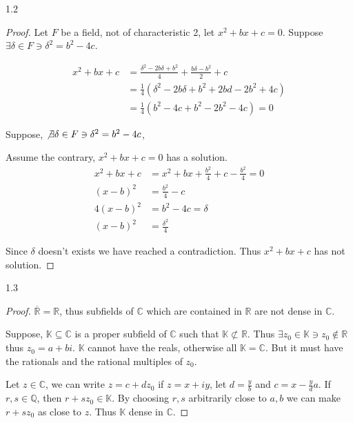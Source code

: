 \documentclass{article}
\newcommand{\C}{\mathbb{C}}
\newcommand{\R}{\mathbb{R}}
\newcommand{\Q}{\mathbb{Q}}
\begin{document}
\begin{PROB}{1.2}\label{Problem 1.2.}
\end{PROB}
\begin{proof}
    Let $F$ be a field, not of characteristic 2, let $x^2 + bx + c = 0$. Suppose $\exists \delta \in F \ni \delta^2 = b^2 - 4c$. 
    
    \begin{align*}
        x^2 + bx + c &= \frac{\delta^2 - 2b \delta + b^2}{4} + \frac{b \delta - b^2}{2} + c \\
        &= \frac{1}{4}(\delta^2 - 2b \delta + b^2 + 2bd - 2b^2 + 4c) \\
        &= \frac{1}{4}(b^2 - 4c + b^2 - 2b^2 - 4c) = 0
    \end{align*}
    
    Suppose, $\not \exists \delta \in F \ni \delta^2 =b^2 - 4c$, 
    
    Assume the contrary, $x^2 + bx + c = 0$ has a solution.  
    \begin{align*}
        x^2 + bx + c &= x^2 + bx + \frac{b^2}{4} + c - \frac{b^2}{4} = 0 \\
        (x - b)^2 &= \frac{b^2}{4} - c \\
        4(x - b)^2 &= b^2 - 4c = \delta \\
        (x - b)^2 &= \frac{\delta^2}{4}
    \end{align*}

    Since $\delta$ doesn't exists we have reached a contradiction. Thus $x^2 + bx + c$ has not solution.   
\end{proof}
\bigskip

\begin{PROB}{1.3}\label{Problem 1.3.}
\end{PROB}
\begin{proof}
    $\overline{\R} = \R$, thus subfields of $\C$ which are contained in $\R$ are not dense in $\C$.
    
    Suppose, $\mathbb{K} \subseteq \C$ is a proper subfield of $\C$ such that $\mathbb{K} \not \subset \R$. Thus $\exists z_0 \in \mathbb{K} \ni z_0 \not \in \R$ thus $z_0 = a + bi$. $\mathbb{K}$ cannot have the reals, otherwise all $\mathbb{K} = \mathbb{\C}$. But it must have the rationals and the rational multiples of $z_0$.      
    
    Let $z \in \C$, we can write $z = c + dz_0$ if $z = x + iy$, let $d = \frac{y}{b}$ and $c = x - \frac{y}{d}a$. If $r, s \in \Q$, then $r +sz_0 \in \mathbb{K}$. By choosing $r, s$ arbitrarily close to $a, b$ we can make $r + sz_0$ as close to $z$. Thus $\mathbb{K}$ dense in $\C$.    
\end{proof}
\end{document}
